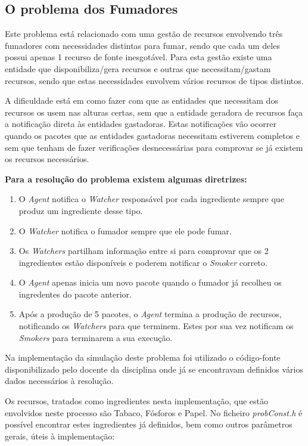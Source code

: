 \documentclass[10pt,portuguese]{article}
\begin{document}
\clearpage

\subsection{O problema dos Fumadores}

\par Este problema está relacionado com uma gestão de recursos envolvendo três fumadores com necessidades distintas para fumar, sendo que cada um deles possui apenas 1 recurso de fonte inesgotável. Para esta gestão existe uma entidade que disponibiliza/gera recursos e outras que necessitam/gastam recursos, sendo que estas necessidades envolvem vários recursos de tipos distintos. 
\par A dificuldade está em como fazer com que as entidades que necessitam dos recursos os usem nas alturas certas, sem que a entidade geradora de recursos faça a notificação direta às entidades gastadoras. Estas notificações vão ocorrer quando os pacotes que as entidades gastadoras necessitam estiverem completos e sem que tenham de fazer verificações desnecessárias para comprovar se já existem os recursos necessários.
\par \textbf{Para a resolução do problema existem algumas diretrizes:}
\begin{enumerate}
  \item O \textit{Agent} notifica o \textit{Watcher} responsável por cada ingrediente sempre que produz um ingrediente desse tipo.
  \item O \textit{Watcher} notifica o fumador sempre que ele pode fumar.
  \item Os \textit{Watchers} partilham informação entre si para comprovar que os 2 ingredientes estão disponíveis e poderem notificar o \textit{Smoker} correto.
  \item O \textit{Agent} apenas inicia um novo pacote quando o fumador já recolheu os ingredentes do pacote anterior.
  \item Após a produção de 5 pacotes, o \textit{Agent} termina a produção de recursos, notificando os \textit{Watchers} para que terminem. Estes por sua vez notificam os \textit{Smokers} para terminarem a sua execução.
\end{enumerate}
\par Na implementação da simulação deste problema foi utilizado o código-fonte disponibilizado pelo docente da disciplina onde já se encontravam definidos vários dados necessários à resolução.

\par Os recursos, tratados como ingredientes nesta implementação, que estão envolvidos neste processo são Tabaco, Fósforos e Papel. No ficheiro \textit{probConst.h} é possível encontrar estes ingredientes já definidos, bem como outros parâmetros gerais, úteis à implementação:
\end{document}
